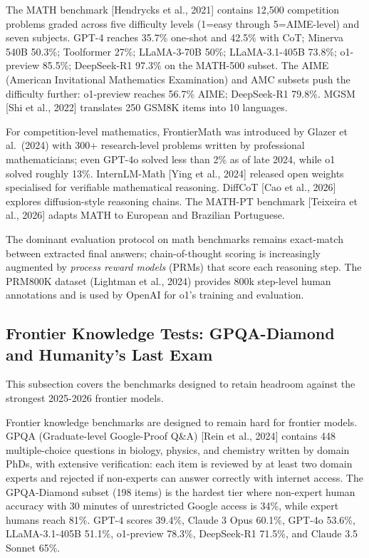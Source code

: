 The MATH benchmark {[}Hendrycks et al., 2021{]} contains 12,500 competition problems graded across five difficulty levels (1=easy through 5=AIME-level) and seven subjects. GPT-4 reaches 35.7\% one-shot and 42.5\% with CoT; Minerva 540B 50.3\%; Toolformer 27\%; LLaMA-3-70B 50\%; LLaMA-3.1-405B 73.8\%; o1-preview 85.5\%; DeepSeek-R1 97.3\% on the MATH-500 subset. The AIME (American Invitational Mathematics Examination) and AMC subsets push the difficulty further: o1-preview reaches 56.7\% AIME; DeepSeek-R1 79.8\%. MGSM {[}Shi et al., 2022{]} translates 250 GSM8K items into 10 languages.

For competition-level mathematics, FrontierMath was introduced by Glazer et al.~(2024) with 300+ research-level problems written by professional mathematicians; even GPT-4o solved less than 2\% as of late 2024, while o1 solved roughly 13\%. InternLM-Math {[}Ying et al., 2024{]} released open weights specialised for verifiable mathematical reasoning. DiffCoT {[}Cao et al., 2026{]} explores diffusion-style reasoning chains. The MATH-PT benchmark {[}Teixeira et al., 2026{]} adapts MATH to European and Brazilian Portuguese.

The dominant evaluation protocol on math benchmarks remains exact-match between extracted final answers; chain-of-thought scoring is increasingly augmented by \emph{process reward models} (PRMs) that score each reasoning step. The PRM800K dataset (Lightman et al., 2024) provides 800k step-level human annotations and is used by OpenAI for o1's training and evaluation.

\subsection{Frontier Knowledge Tests: GPQA-Diamond and Humanity's Last Exam}\label{frontier-knowledge-tests-gpqa-diamond-and-humanitys-last-exam}

This subsection covers the benchmarks designed to retain headroom against the strongest 2025-2026 frontier models.

Frontier knowledge benchmarks are designed to remain hard for frontier models. GPQA (Graduate-level Google-Proof Q\&A) {[}Rein et al., 2024{]} contains 448 multiple-choice questions in biology, physics, and chemistry written by domain PhDs, with extensive verification: each item is reviewed by at least two domain experts and rejected if non-experts can answer correctly with internet access. The GPQA-Diamond subset (198 items) is the hardest tier where non-expert human accuracy with 30 minutes of unrestricted Google access is 34\%, while expert humans reach 81\%. GPT-4 scores 39.4\%, Claude 3 Opus 60.1\%, GPT-4o 53.6\%, LLaMA-3.1-405B 51.1\%, o1-preview 78.3\%, DeepSeek-R1 71.5\%, and Claude 3.5 Sonnet 65\%.

